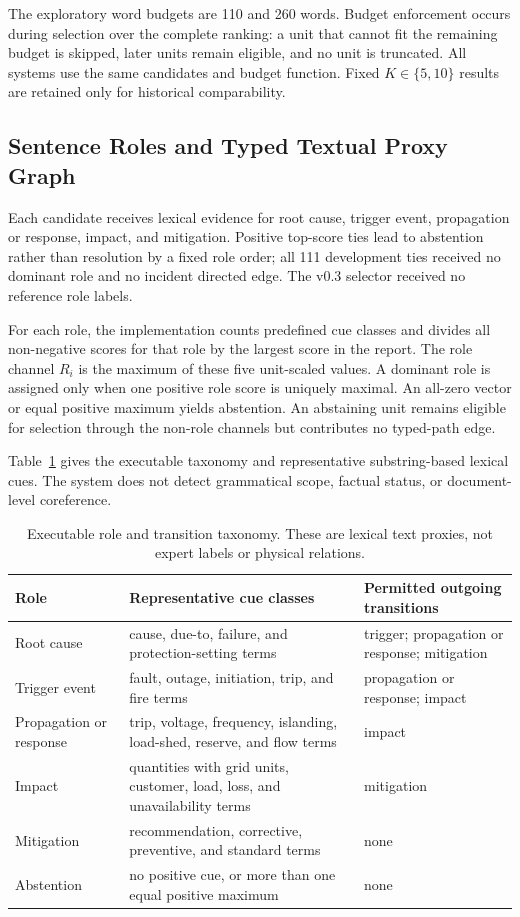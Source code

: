 \documentclass[information,article,submit,moreauthors]{Definitions/mdpi}
\begin{document}
The exploratory word budgets are 110 and 260 words. Budget enforcement occurs during selection over the complete ranking: a unit that cannot fit the remaining budget is skipped, later units remain eligible, and no unit is truncated. All systems use the same candidates and budget function. Fixed $K\in\{5,10\}$ results are retained only for historical comparability.

\subsection{Sentence Roles and Typed Textual Proxy Graph}

Each candidate receives lexical evidence for root cause, trigger event, propagation or response, impact, and mitigation. Positive top-score ties lead to abstention rather than resolution by a fixed role order; all 111 development ties received no dominant role and no incident directed edge. The v0.3 selector received no reference role labels.

For each role, the implementation counts predefined cue classes and divides all non-negative scores for that role by the largest score in the report. The role channel $R_i$ is the maximum of these five unit-scaled values. A dominant role is assigned only when one positive role score is uniquely maximal. An all-zero vector or equal positive maximum yields abstention. An abstaining unit remains eligible for selection through the non-role channels but contributes no typed-path edge.

Table~\ref{tab:taxonomy} gives the executable taxonomy and representative substring-based lexical cues. The system does not detect grammatical scope, factual status, or document-level coreference.

\begin{table}[H]
\caption{Executable role and transition taxonomy. These are lexical text proxies, not expert labels or physical relations.}
\label{tab:taxonomy}\centering\small
\begin{tabularx}{\textwidth}{p{2.2cm}XX}
\toprule
Role & Representative cue classes & Permitted outgoing transitions\\
\midrule
Root cause & cause, due-to, failure, and protection-setting terms & trigger; propagation or response; mitigation\\
Trigger event & fault, outage, initiation, trip, and fire terms & propagation or response; impact\\
Propagation or response & trip, voltage, frequency, islanding, load-shed, reserve, and flow terms & impact\\
Impact & quantities with grid units, customer, load, loss, and unavailability terms & mitigation\\
Mitigation & recommendation, corrective, preventive, and standard terms & none\\
Abstention & no positive cue, or more than one equal positive maximum & none\\
\bottomrule
\end{tabularx}
\end{table}
\end{document}
